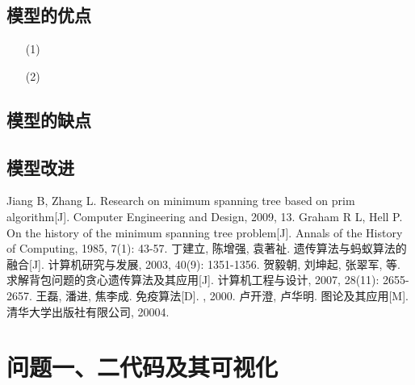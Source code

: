 \documentclass{whutmod}
\begin{document}
		\subsection{模型的优点}
			\begin{itemize}                                             
			\item [(1)]
			\item [(2)] 	
			\end{itemize}
		\subsection{模型的缺点}

  		\subsection{模型改进}

  
  
 
	\newpage	%
	\nocite{*}		%
	\begin{thebibliography}{9}%
		Jiang B, Zhang L. Research on minimum spanning tree based on prim algorithm[J]. Computer Engineering and Design, 2009, 13.
		Graham R L, Hell P. On the history of the minimum spanning tree problem[J]. Annals of the History of Computing, 1985, 7(1): 43-57.
		丁建立, 陈增强, 袁著祉. 遗传算法与蚂蚁算法的融合[J]. 计算机研究与发展, 2003, 40(9): 1351-1356.
		贺毅朝, 刘坤起, 张翠军, 等. 求解背包问题的贪心遗传算法及其应用[J]. 计算机工程与设计, 2007, 28(11): 2655-2657.
		王磊, 潘进, 焦李成. 免疫算法[D]. , 2000.
		卢开澄, 卢华明. 图论及其应用[M]. 清华大学出版社有限公司, 20004.
	\end{thebibliography}

	\newpage
	\appendix %
	\section{问题一、二代码及其可视化}
\end{document}
